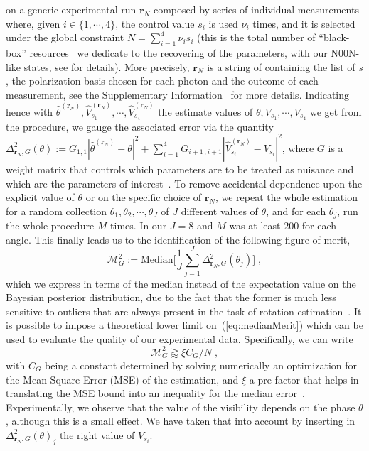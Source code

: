 \documentclass[aps,pra,twocolumn,notitlepage,superscriptaddress]{revtex4-1}
\begin{document}
on a generic experimental run ${{\mathbf r}_N}$ composed by series of individual measurements where, given $i\in \{1,\cdots, 4\}$, the control value $s_i$ is used $\nu_i$ times, and it is selected under the global constraint $N =\sum_{i=1}^4 \nu_i s_i$ (this is the total number of ``black-box'' resources~\cite{PhysRevLett.96.010401} we dedicate to the recovering of the parameters, with our N00N-like states, see \cite{SI} for details). More precisely, ${{\mathbf r}_N}$ is a string of containing the list of $s$, the polarization basis chosen for each photon and the outcome of each measurement, see the Supplementary Information~\cite{SI} for more details. Indicating hence with $\hat{\theta}^{({\mathbf r}_N)}, \hat{V}^{({\mathbf r}_N)}_{s_1}, \cdots, \hat{V}^{({\mathbf r}_N)}_{s_4}$ the estimate values of ${\theta}, {V}_{s_1}, \cdots, {V}_{s_4}$ we get from the procedure, we gauge the associated error via the quantity $\Delta^{2}_{{\mathbf r}_N,G}(\theta):=G_{1,1}|\hat{\theta}^{({\mathbf r}_N)}-\theta|^2 + \sum_{i=1}^4 G_{i+1\, , i+1} |\hat{V}^{({\mathbf r}_N)}_{s_i}-V_{s_i}|^2$, where $G$ is a weight matrix that controls which parameters are to be treated as nuisance and which are the parameters of interest~\cite{goldberg2020multiphase}. To remove accidental dependence upon the explicit value of $\theta$ or on the specific choice of ${{\mathbf r}_N}$, we repeat the whole estimation for a random collection $\theta_1, \theta_2,\cdots,\theta_J$ of $J$ different values of $\theta$, and for each $\theta_j$, run the whole procedure $M$ times. In our $J=8$ and $M$ was at least $200$ for each angle. This finally leads us to the identification of the following figure of merit,
%
\begin{equation}
\mathcal{M}^2_G := \text{Median} \Big[ \frac{1}{J}
	\sum_{j=1}^J \Delta^{2}_{{\mathbf r}_N,G}(\theta_j) \Big] \; ,
	\label{eq:medianMerit}
\end{equation}
%
which we express in terms of the median instead of the expectation value on the Bayesian posterior distribution, due to the fact that the former is much less sensitive to outliers that are always present in the task of rotation estimation~\cite{cimini2021non}. It is possible to impose a theoretical lower limit on~(\ref{eq:medianMerit}) which can be used to evaluate the quality of our experimental data. Specifically, we can write
%
\begin{equation}
	\mathcal{M}^2_G \gtrapprox \xi {C_G}/{N} \; ,
	\label{eq:boundMSE}
\end{equation}
%
with $C_G$ being a constant determined by solving numerically an optimization for the Mean Square Error (MSE) of the estimation, and $\xi$ a pre-factor that helps in translating the MSE bound into an inequality for the median error~\cite{SI}. Experimentally, we observe that the value of the visibility depends on the phase $\theta$, although this is a small effect. We have taken that into account by inserting in $\Delta_{{\boldsymbol{r}_N}, G}^2 (\theta)_j$ the right value of $V_{s_i}$.
\end{document}
